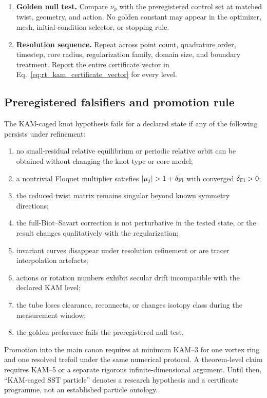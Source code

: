 \begin{enumerate}
    \item \textbf{Golden null test.}
    Compare \(\nu_{\phi}\) with the preregistered control set at matched twist,
    geometry, and action.  No golden constant may appear in the optimizer,
    mesh, initial-condition selector, or stopping rule.

    \item \textbf{Resolution sequence.}
    Repeat across point count, quadrature order, timestep, core radius,
    regularization family, domain size, and boundary treatment.  Report the
    entire certificate vector in Eq.~\eqref{eq:rt_kam_certificate_vector} for
    every level.
\end{enumerate}

\subsection{Preregistered falsifiers and promotion rule}
\label{subsec:rt_kam_falsifiers}

The KAM-caged knot hypothesis fails for a declared state if any of the
following persists under refinement:
\begin{enumerate}
    \item no small-residual relative equilibrium or periodic relative orbit can
    be obtained without changing the knot type or core model;
    \item a nontrivial Floquet multiplier satisfies \(|\mu_j|>1+\delta_{\rm Fl}\)
    with converged \(\delta_{\rm Fl}>0\);
    \item the reduced twist matrix remains singular beyond known symmetry
    directions;
    \item the full-Biot--Savart correction is not perturbative in the tested
    state, or the result changes qualitatively with the regularization;
    \item invariant curves disappear under resolution refinement or are tracer
    interpolation artefacts;
    \item actions or rotation numbers exhibit secular drift incompatible with
    the declared KAM level;
    \item the tube loses clearance, reconnects, or changes isotopy class during
    the measurement window;
    \item the golden preference fails the preregistered null test.
\end{enumerate}

Promotion into the main canon requires at minimum KAM--3 for one vortex ring
and one resolved trefoil under the same numerical protocol.  A theorem-level
claim requires KAM--5 or a separate rigorous infinite-dimensional argument.
Until then, ``KAM-caged SST particle'' denotes a research hypothesis and a
certificate programme, not an established particle ontology.

